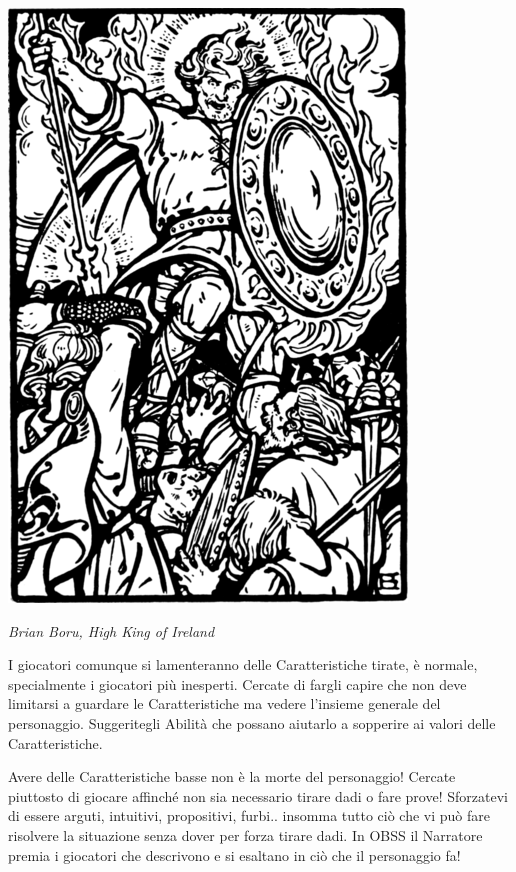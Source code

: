 \begin{multicols}{2}
\begin{center}
	\includegraphics[width=0.9\linewidth]{immagini/guerrieroispirato.png}

	\emph{Brian Boru, High King of Ireland}
\end{center}

\begin{changemargin}{0.3cm}{0.3cm}\begin{narratore}
I giocatori comunque si lamenteranno delle Caratteristiche tirate, è normale, specialmente i giocatori più inesperti. Cercate di fargli capire che non deve limitarsi a guardare le Caratteristiche ma vedere l'insieme generale del personaggio. Suggeritegli Abilità che possano aiutarlo a sopperire ai valori delle Caratteristiche.
\end{narratore}\end{changemargin}

\medskip

\begin{changemargin}{0.3cm}{0.3cm}\begin{tcolorbox}[title = Il Personaggio fa schifo! - Caratteristiche basse]
Avere delle Caratteristiche basse non è la morte del personaggio! Cercate piuttosto di giocare affinché non sia necessario tirare dadi o fare prove! Sforzatevi di essere arguti, intuitivi, propositivi, furbi.. insomma tutto ciò che vi può fare risolvere la situazione senza dover per forza tirare dadi. In OBSS il Narratore premia i giocatori che descrivono e si esaltano in ciò che il personaggio fa!
\end{tcolorbox}\end{changemargin}


\end{multicols}

